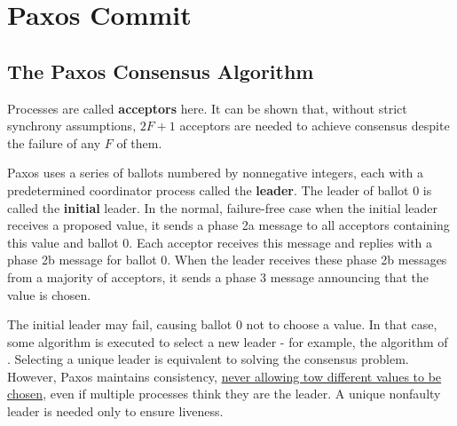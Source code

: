 \documentclass[11pt]{article}
\begin{document}
\section{Paxos Commit}
\label{sec:org7ef261f}
\subsection{The Paxos Consensus Algorithm}
\label{sec:orgf14e9f5}
Processes are called \textbf{acceptors} here. It can be shown that, without strict synchrony assumptions,
\(2F+1\) acceptors are needed to achieve consensus despite the failure of any \(F\) of them.

Paxos uses a series of ballots numbered by nonnegative integers, each with a predetermined coordinator
process called the \textbf{leader}. The leader of ballot 0 is called the \textbf{initial} leader. In the normal,
failure-free case when the initial leader receives a proposed value, it sends a phase 2a message to
all acceptors containing this value and ballot 0. Each acceptor receives this message and replies with
a phase 2b message for ballot 0. When the leader receives these phase 2b  messages from a majority of
acceptors, it sends a phase 3 message announcing that the value is chosen.

The initial leader may fail, causing ballot 0 not to choose a value. In that case, some algorithm is
executed to select a new leader - for example, the algorithm of \cite{10.1007/3-540-45414-4_8}.
Selecting a unique leader is equivalent to solving the consensus problem. However, Paxos maintains
consistency, \uline{never allowing tow different values to be chosen}, even if multiple processes think they
are the leader. A unique nonfaulty leader is needed only to ensure liveness.
\end{document}
